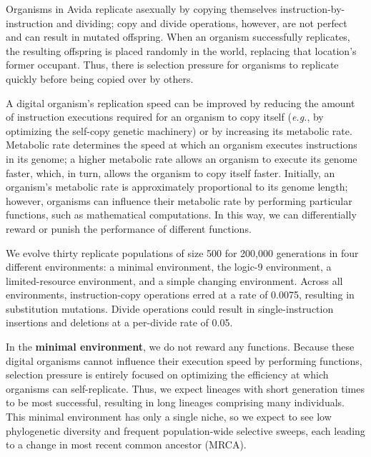 \documentclass[letterpaper]{article}
\begin{document}
Organisms in Avida replicate asexually by copying themselves instruction-by-instruction and dividing; copy and divide operations, however, are not perfect and can result in mutated offspring.
When an organism successfully replicates, the resulting offspring is placed randomly in the world, replacing that location's former occupant.
Thus, there is selection pressure for organisms to replicate quickly before being copied over by others.

A digital organism's replication speed can be improved by reducing the amount of instruction executions required for an organism to copy itself (\textit{e.g.}, by optimizing the self-copy genetic machinery) or by increasing its metabolic rate. Metabolic rate determines the speed at which an organism executes instructions in its genome; a higher metabolic rate allows an organism to execute its genome faster, which, in turn, allows the organism to copy itself faster. 
Initially, an organism's metabolic rate is approximately proportional
to its genome length; however, organisms can influence their metabolic rate by performing particular functions, such as mathematical computations.
In this way, we can differentially reward or punish the performance of different functions.

We evolve thirty replicate populations of size 500 for 200,000 generations in four different environments: a minimal environment, the logic-9 environment, a limited-resource environment, and a simple changing environment. %
Across all environments, instruction-copy operations erred at a rate of 0.0075, resulting in substitution mutations. 
Divide operations could result in single-instruction insertions and deletions at a per-divide rate of 0.05.

In the \textbf{minimal environment}, we do not reward any functions. Because these digital organisms cannot influence their execution speed by performing functions, selection pressure is entirely focused on optimizing the efficiency at which organisms can self-replicate. 
Thus, we expect lineages with short generation times to be most successful, resulting in long lineages comprising many individuals. This minimal environment has only a single niche, so we expect to see low phylogenetic diversity and frequent population-wide selective sweeps, each leading to a change in most recent common ancestor (MRCA).
\end{document}
